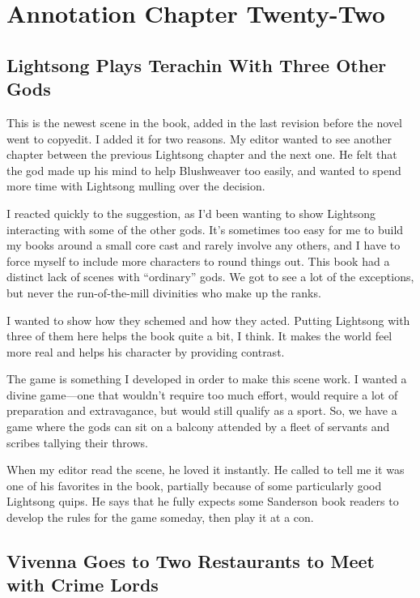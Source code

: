 \section{Annotation Chapter Twenty-Two}

\subsection*{Lightsong Plays Terachin With Three Other Gods}

This is the newest scene in the book, added in the last revision before the novel went to copyedit. I added it for two reasons. My editor wanted to see another chapter between the previous Lightsong chapter and the next one. He felt that the god made up his mind to help Blushweaver too easily, and wanted to spend more time with Lightsong mulling over the decision.

I reacted quickly to the suggestion, as I’d been wanting to show Lightsong interacting with some of the other gods. It’s sometimes too easy for me to build my books around a small core cast and rarely involve any others, and I have to force myself to include more characters to round things out. This book had a distinct lack of scenes with “ordinary” gods. We got to see a lot of the exceptions, but never the run-of-the-mill divinities who make up the ranks.

I wanted to show how they schemed and how they acted. Putting Lightsong with three of them here helps the book quite a bit, I think. It makes the world feel more real and helps his character by providing contrast.

The game is something I developed in order to make this scene work. I wanted a divine game—one that wouldn’t require too much effort, would require a lot of preparation and extravagance, but would still qualify as a sport. So, we have a game where the gods can sit on a balcony attended by a fleet of servants and scribes tallying their throws.

When my editor read the scene, he loved it instantly. He called to tell me it was one of his favorites in the book, partially because of some particularly good Lightsong quips. He says that he fully expects some Sanderson book readers to develop the rules for the game someday, then play it at a con.



\subsection*{Vivenna Goes to Two Restaurants to Meet with Crime Lords}

